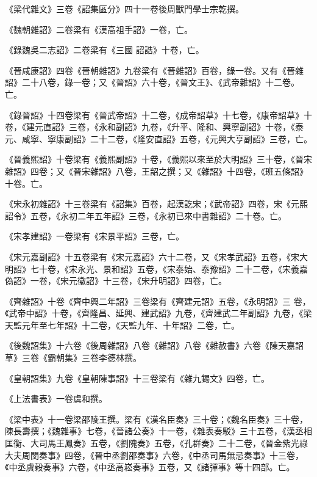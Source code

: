 \begin{pinyinscope}
 《梁代雜文》三卷《詔集區分》四十一卷後周獸門學士宗乾撰。



 《魏朝雜詔》二卷梁有《漢高祖手詔》一卷，亡。



 《錄魏吳二志詔》二卷梁有《三國
 詔誥》十卷，亡。



 《晉咸康詔》四卷《晉朝雜詔》九卷梁有《晉雜詔》百卷，錄一卷。又有《晉雜詔》二十八卷，錄一卷；又《晉詔》六十卷，《晉文王》、《武帝雜詔》十二卷。亡。



 《錄晉詔》十四卷梁有《晉武帝詔》十二卷，《成帝詔草》十七卷，《康帝詔草》十卷，《建元直詔》三卷，《永和副詔》九卷，《升平、隆和、興寧副詔》十卷，《泰元、咸寧、寧康副詔》二十二卷，《隆安直詔》五卷，《元興大亨副詔》三卷，亡。



 《晉義熙詔》十卷梁有《義熙副詔》十卷，《義熙以來至於大明詔》三十卷，《晉宋雜詔》四卷；又《晉宋雜詔》八卷，王韶之撰；又《雜詔》十四卷，《班五條詔》十卷。亡。



 《宋永初雜詔》十三卷梁有《詔集》百卷，起漢訖宋；《武帝詔》四卷，宋《元熙詔令》五卷，《永初二年五年詔》三卷，《永初已來中書雜詔》二十卷。亡。



 《宋孝建詔》一卷梁有《宋景平詔》三卷，亡。



 《宋元嘉副詔》十五卷梁有《宋元嘉詔》六十二卷，又《宋孝武詔》五卷，《宋大明詔》七十卷，《宋永光、景和詔》五卷，《宋泰始、泰豫詔》二十二卷，《宋義嘉偽詔》一卷，《宋元徽詔》十三卷，《宋升明詔》四卷，亡。



 《齊雜詔》十卷《齊中興二年詔》三卷梁有《齊建元詔》五卷，《永明詔》三
 卷，《武帝中詔》十卷，《齊隆昌、延興、建武詔》九卷，《齊建武二年副詔》九卷，《梁天監元年至七年詔》十二卷，《天監九年、十年詔》二卷，亡。



 《後魏詔集》十六卷《後周雜詔》八卷《雜詔》八卷《雜赦書》六卷《陳天嘉詔草》三卷《霸朝集》三卷李德林撰。



 《皇朝詔集》九卷《皇朝陳事詔》十三卷梁有《雜九錫文》四卷，亡。



 《上法書表》一卷虞和撰。



 《梁中表》十一卷梁邵陵王撰。梁有《漢名臣奏》三十卷；《魏名臣奏》三十卷，陳長壽撰；《魏雜事》七卷，《晉諸公奏》十一卷，《雜表奏駁》三十五卷，《漢丞相匡衡、大司馬王鳳奏》五卷，《劉隗奏》五卷，《孔群奏》二十二卷，《晉金紫光祿大夫周閔奏事》四卷，《晉中丞劉邵奏事》六卷，《中丞司馬無忌奏事》十三卷，《中丞虞穀奏事》六卷，《中丞高崧奏事》五卷，又《諸彈事》等十四部。亡。




\end{pinyinscope}
